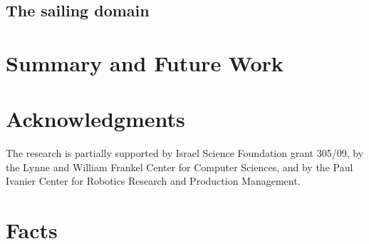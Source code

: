 \documentclass{article}
\begin{document}
\subsection{The sailing domain}


%

\section{Summary and Future Work}

\section*{Acknowledgments}

The research is partially supported by Israel
Science Foundation grant 305/09, by the Lynne and William Frankel
Center for Computer Sciences, and by the Paul Ivanier Center for
Robotics Research and Production Management.




\pagebreak

\appendix

\section{Facts}
\end{document}
